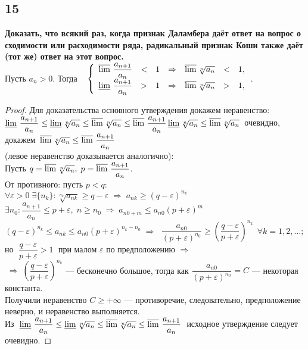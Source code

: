 \documentclass[a4paper, fleqn]{article}
\begin{document}
    \subsection*{15}
        \textbf{ Доказать, что всякий раз, когда признак Даламбера даёт ответ на вопрос о сходимости или расходимости ряда, 
    радикальный признак Коши также даёт (тот же) ответ на этот вопрос.} \\[5 pt]
    Пусть $a_n > 0$. Тогда 
    $\;\;\; \left\{\begin{array}{lllllll}
    \varlimsup \, \dfrac{a_{n+1}}{a_n} & < & 1 & \Rightarrow & \varlimsup \sqrt[n]{a_n} & < & 1,\\[5 pt]
    \varliminf \, \dfrac{a_{n+1}}{a_n} & > & 1 & \Rightarrow & \varlimsup \sqrt[n]{a_n} & > & 1,\\[5 pt]
    \end{array}\right.$. \\
    \begin{proof}
    Для доказательства основного утверждения докажем неравенство: \\[3 pt]
    $\varliminf \, \dfrac{a_{n+1}}{a_n} \le \varliminf \sqrt[n]{a_n} \le \varlimsup \sqrt[n]{a_n} \le \varlimsup \, \dfrac{a_{n+1}}{a_n} \\[3 pt]
    \varliminf \sqrt[n]{a_n} \le \varlimsup \sqrt[n]{a_n} \,$ очевидно, докажем 
    $\, \varlimsup \sqrt[n]{a_n} \le \varlimsup \, \dfrac{a_{n+1}}{a_n}$ \\[3 pt]
    (левое неравенство доказывается аналогично): \\[3 pt]
    Пусть $q = \varlimsup \sqrt[n]{a_n}, \; p = \varlimsup \, \dfrac{a_{n+1}}{a_n}$. \\[3 pt]
    От противного: пусть $p < q$:\\[3 pt]
    $\forall \varepsilon > 0 \; \exists \{ n_k \} : \sqrt[n_k]{a_{nk}} \ge q - \varepsilon \; \Rightarrow \; a_{nk} \ge (q - \varepsilon)^{n_k}$ \\[3 pt]
    $\exists n_0 : \dfrac{a_{n+1}}{a_n} \le p + \varepsilon, \; n \ge n_0 \; \Rightarrow \; a_{n0 + m} \le a_{n0} (p + \varepsilon)^m$ \\[3 pt]
    $(q - \varepsilon)^{n_k} \le a_{nk} \le a_{n0} (p + \varepsilon)^{n_k - n_0} \; \Rightarrow \; $
    $\dfrac{a_{n0}}{(p + \varepsilon)^{n_0}} \ge \left( \dfrac{q - \varepsilon}{p + \varepsilon} \right)^{n_k} \;\, \forall k = 1, 2, \dots;$ \\[3 pt]
    но $\; \dfrac{q - \varepsilon}{p + \varepsilon} > 1 \; $ при малом $\varepsilon$ по предположению $\Rightarrow$ \\[3 pt]
    $\; \Rightarrow \; \left( \dfrac{q - \varepsilon}{p + \varepsilon} \right)^{n_k}$ --- бесконечно большое, тогда как
    $\dfrac{a_{n0}}{(p + \varepsilon)^{n_0}} = C$ --- некоторая константа. \\[3 pt]
    Получили неравенство $C \ge +\infty$ --- противоречие, следовательно, предположение неверно, и неравенство выполняется. \\[3 pt]
    Из $\; \varliminf \, \dfrac{a_{n+1}}{a_n} \le \varliminf \sqrt[n]{a_n} \le \varlimsup \sqrt[n]{a_n} \le \varlimsup \, \dfrac{a_{n+1}}{a_n}\; $ 
        исходное утверждение следует очевидно.
    \end{proof}    
\end{document}
